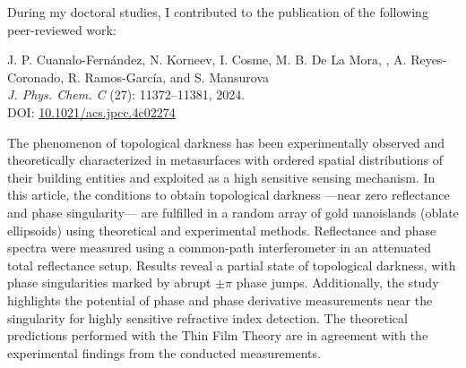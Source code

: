 
 During my doctoral studies, I contributed to the publication of the following peer-reviewed work:
 
	\begin{tcolorbox}[boxsep = .75em, leftupper = 2.5em,			
		title = Phase Singularity in Random Gold Metasurface for Refractive Index Sensing: Experimental Demonstration and Theoretical Analysis \cite{cuanalo_phase_2024}]
%		
		J. P. Cuanalo-Fernández, N. Korneev, I. Cosme, M. B. De La Mora, , A. Reyes-Coronado, R. Ramos-García, and S. Mansurova\\[.5em]
		\textit{J. Phys. Chem. C} (27): 11372–11381, 2024.\\[.5em]
		DOI: \href{https://pubs.acs.org/doi/10.1021/acs.jpcc.4c02274}{10.1021/acs.jpcc.4c02274}
	\end{tcolorbox}
%
	The phenomenon of topological darkness has been experimentally observed and  theoretically characterized in metasurfaces with ordered spatial distributions of their building entities and exploited as a high sensitive sensing mechanism. In this article, the conditions to obtain topological darkness ---near zero reflectance and phase singularity--- are fulfilled in a random array of gold nanoislands (oblate ellipsoids) using theoretical and experimental methods. Reflectance and phase spectra were measured using a common-path interferometer in an attenuated total reflectance setup. Results reveal a partial state of topological darkness, with phase singularities marked by abrupt $\pm\pi$ phase jumps. Additionally, the study highlights the potential of phase and phase derivative measurements near the singularity for highly sensitive refractive index detection. The theoretical predictions performed with the Thin Film Theory are in agreement with the experimental findings from the conducted measurements.

